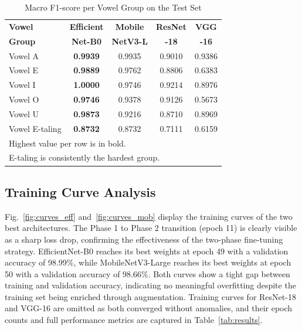 \documentclass[conference]{IEEEtran}
\begin{document}
\begin{table}[t]
\caption{Macro F1-score per Vowel Group on the Test Set}
\label{tab:per_vowel}
\begin{center}
\renewcommand{\arraystretch}{1.3}
\small
\begin{tabular}{lcccc}
\toprule
\textbf{Vowel} & \textbf{Efficient} & \textbf{Mobile}
  & \textbf{ResNet} & \textbf{VGG} \\
\textbf{Group} & \textbf{Net-B0} & \textbf{NetV3-L}
  & \textbf{-18} & \textbf{-16} \\
\midrule
Vowel A        & \textbf{0.9939} & 0.9935 & 0.9010 & 0.9386 \\
Vowel E        & \textbf{0.9889} & 0.9762 & 0.8806 & 0.6383 \\
Vowel I        & \textbf{1.0000} & 0.9746 & 0.9214 & 0.8976 \\
Vowel O        & \textbf{0.9746} & 0.9378 & 0.9126 & 0.5673 \\
Vowel U        & \textbf{0.9873} & 0.9216 & 0.8710 & 0.8969 \\
Vowel E-taling & \textbf{0.8732} & 0.8732 & 0.7111 & 0.6159 \\
\bottomrule
\multicolumn{5}{l}{\footnotesize Highest value per row is in bold.} \\
\multicolumn{5}{l}{\footnotesize E-taling is consistently the hardest group.}
\end{tabular}
\end{center}
\end{table}

\subsection{Training Curve Analysis}

Fig.~\ref{fig:curves_eff} and~\ref{fig:curves_mob} display the training
curves of the two best architectures.
The Phase 1 to Phase 2 transition (epoch 11) is clearly visible as a
sharp loss drop, confirming the effectiveness of the two-phase
fine-tuning strategy.
EfficientNet-B0 reaches its best weights at epoch 49 with a validation
accuracy of 98.99\%, while MobileNetV3-Large reaches its best weights
at epoch 50 with a validation accuracy of 98.66\%.
Both curves show a tight gap between training and validation accuracy,
indicating no meaningful overfitting despite the training set being
enriched through augmentation.
Training curves for ResNet-18 and VGG-16 are omitted as both converged
without anomalies, and their epoch counts and full performance metrics
are captured in Table~\ref{tab:results}.
\end{document}
